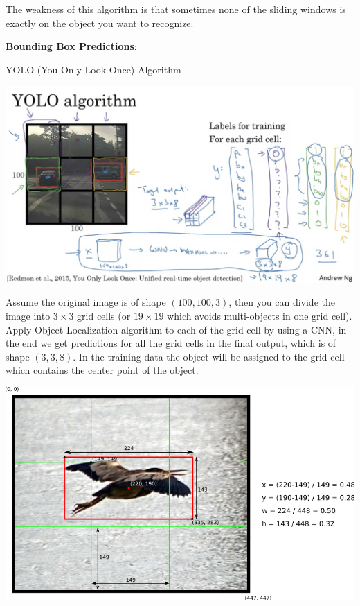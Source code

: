 \documentclass{article}
\begin{document}
\noindent The weakness of this algorithm is that sometimes none of the sliding windows is exactly on the object you want to recognize.

\bigskip

\noindent \textbf{Bounding Box Predictions}:

\noindent YOLO (You Only Look Once) Algorithm

\begin{center}
\includegraphics[scale=0.3]{./images/bounding_box_predictions.png}
\end{center}

\noindent Assume the original image is of shape \((100, 100, 3)\), then you can divide the image into \(3 \times 3\) grid cells (or \(19 \times 19\) which avoids multi-objects in one grid cell). Apply Object Localization algorithm to each of the grid cell by using a CNN, in the end we get predictions for all the grid cells in the final output, which is of shape \((3, 3, 8)\). In the training data the object will be assigned to the grid cell which contains the center point of the object.

\begin{center}
\includegraphics[scale=0.3]{./images/yolo_bounding_box.png}
\end{center}
\end{document}
